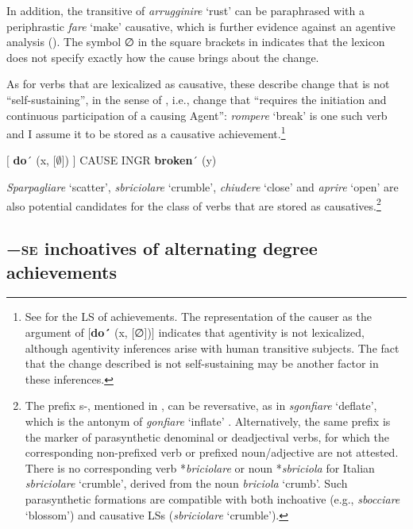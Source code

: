 \documentclass[output=paper,colorlinks,citecolor=brown
]{langscibook}
\begin{document}
In addition, the transitive of \textit{arrugginire} ‘rust’ can be paraphrased with a periphrastic \textit{fare} ‘make’ causative, which is further evidence against an agentive analysis (). The symbol ∅ in the square brackets in  indicates that the lexicon does not specify exactly how the cause brings about the change.

As for verbs that are lexicalized as causative, these describe change that is not “self-sustaining”, in the sense of \citet[496]{kiparsky1997remarks}, i.e., change that “requires the initiation and continuous participation of a causing Agent”: \textit{rompere} ‘break’ is one such verb and I assume it to be stored as a causative achievement.\footnote{See \citet[114]{vanvalin2023principles} for the LS of achievements. The representation of the causer as the argument of [\textbf{do´} (x, [∅])] indicates  that agentivity is not lexicalized, although agentivity inferences arise with human transitive subjects. The fact that the change described is not self-sustaining may be another factor in these inferences.}

\ea \label{bentley_example_47}
    $\lbrack$ \textbf{do}´ (x, $\lbrack \emptyset \rbrack$) $\rbrack$ CAUSE INGR \textbf{broken}´ (y)
\z

\textit{Sparpagliare} ‘scatter’, \textit{sbriciolare} ‘crumble’, \textit{chiudere} ‘close’ and \textit{aprire} ‘open’ are also potential candidates for the class of verbs that are stored as causatives.\footnote{The prefix s-, mentioned in , can be reversative, as in \textit{sgonfiare} ‘deflate’, which is the antonym of \textit{gonfiare} ‘inflate’ \citep{iacobini2004prefissazione}. Alternatively, the same prefix is the marker of parasynthetic denominal or deadjectival verbs, for which the corresponding non-prefixed verb or prefixed noun/adjective are not attested. There is no corresponding verb *\textit{briciolare} or noun *\textit{sbriciola} for Italian \textit{sbriciolare} ‘crumble’, derived from the noun \textit{briciola} ‘crumb’. Such parasynthetic formations are compatible with both inchoative (e.g., \textit{sbocciare} ‘blossom’) and causative LSs (\textit{sbriciolare} ‘crumble’).}

\subsection{−\textsc{se} inchoatives of alternating degree achievements}
\label{bentley_section_5.3}
\end{document}
